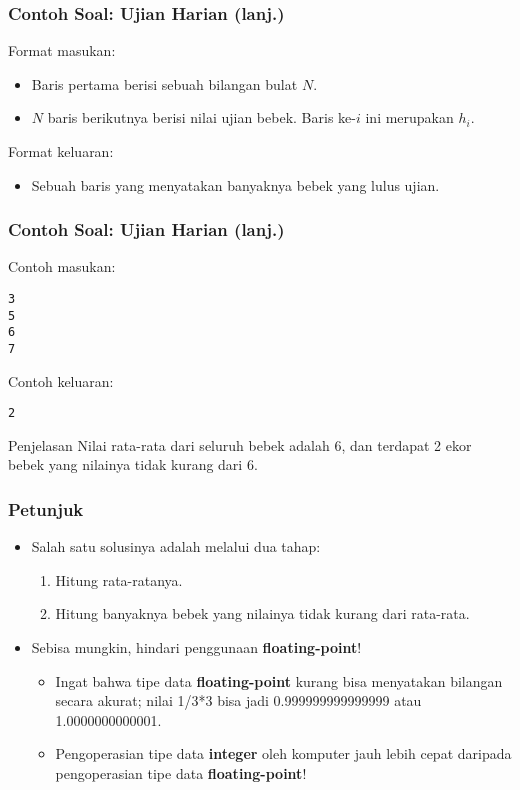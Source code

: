 \documentclass{beamer}
\begin{document}
\begin{frame}
\frametitle{Contoh Soal: Ujian Harian (lanj.)}
Format masukan:
\begin{itemize}
	\item Baris pertama berisi sebuah bilangan bulat $N$.
	\item $N$ baris berikutnya berisi nilai ujian bebek. Baris ke-$i$ ini merupakan $h_i$.
\end{itemize}
Format keluaran:
\begin{itemize}
	\item Sebuah baris yang menyatakan banyaknya bebek yang lulus ujian.
\end{itemize}
\end{frame}

\begin{frame}[fragile]
\frametitle{Contoh Soal: Ujian Harian (lanj.)}
Contoh masukan:
\begin{lstlisting}
3
5
6
7
\end{lstlisting}
Contoh keluaran:
\begin{lstlisting}
2
\end{lstlisting}
\begin{block}{Penjelasan}
Nilai rata-rata dari seluruh bebek adalah 6, dan terdapat 2 ekor bebek yang nilainya tidak kurang dari 6.
\end{block}
\end{frame}

\begin{frame}
\frametitle{Petunjuk}
\begin{itemize}
	\item Salah satu solusinya adalah melalui dua tahap:
	\begin{enumerate}
		\item Hitung rata-ratanya.
		\item Hitung banyaknya bebek yang nilainya tidak kurang dari rata-rata.
	\end{enumerate}
	\item Sebisa mungkin, hindari penggunaan \textbf{\alert{floating-point}}!
	\begin{itemize}
		\item Ingat bahwa tipe data \textbf{floating-point} kurang bisa menyatakan bilangan secara akurat; nilai 1/3*3 bisa jadi 0.999999999999999 atau 1.0000000000001.
		\item Pengoperasian tipe data \textbf{integer} oleh komputer jauh lebih cepat daripada pengoperasian tipe data \textbf{floating-point}!
	\end{itemize}
\end{itemize}
\end{frame}
\end{document}
